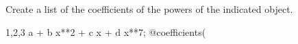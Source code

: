 
Create a list of the coefficients of the powers of the indicated object.
\begin{screen}{1,2,3}
a + b x**2 + c x + d x**7;
@coefficients(%
\end{screen}




